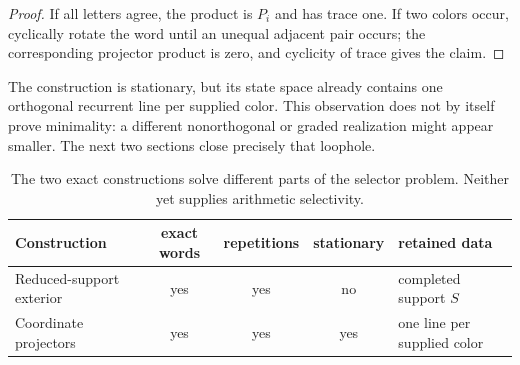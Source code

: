 \begin{proof}
If all letters agree, the product is \(P_i\) and has trace one.  If two colors
occur, cyclically rotate the word until an unequal adjacent pair occurs; the
corresponding projector product is zero, and cyclicity of trace gives the
claim.
\end{proof}

The construction is stationary, but its state space already contains one
orthogonal recurrent line per supplied color.  This observation does not by
itself prove minimality: a different nonorthogonal or graded realization
might appear smaller.  The next two sections close precisely that loophole.

\begin{table}[t]
\centering
\small
\caption{The two exact constructions solve different parts of the selector
problem.  Neither yet supplies arithmetic selectivity.}
\label{tab:selector-comparison}
\begin{tabularx}{\textwidth}{L{37mm} c c c Y}
\toprule
Construction & exact words & repetitions & stationary & retained data \\
\midrule
Reduced-support exterior & yes & yes & no & completed support \(S\) \\
Coordinate projectors & yes & yes & yes & one line per supplied color \\
\bottomrule
\end{tabularx}
\end{table}
